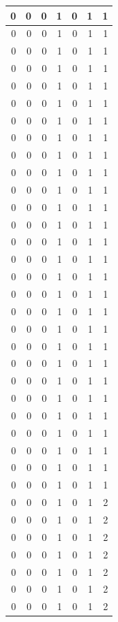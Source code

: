 \documentclass[
  12pt,
]{krantz}
\begin{document}
\begin{tabular}{r|r|r|r|r|r|r}
\hline
0 & 0 & 0 & 1 & 0 & 1 & 1\\
\hline
0 & 0 & 0 & 1 & 0 & 1 & 1\\
\hline
0 & 0 & 0 & 1 & 0 & 1 & 1\\
\hline
0 & 0 & 0 & 1 & 0 & 1 & 1\\
\hline
0 & 0 & 0 & 1 & 0 & 1 & 1\\
\hline
0 & 0 & 0 & 1 & 0 & 1 & 1\\
\hline
0 & 0 & 0 & 1 & 0 & 1 & 1\\
\hline
0 & 0 & 0 & 1 & 0 & 1 & 1\\
\hline
0 & 0 & 0 & 1 & 0 & 1 & 1\\
\hline
0 & 0 & 0 & 1 & 0 & 1 & 1\\
\hline
0 & 0 & 0 & 1 & 0 & 1 & 1\\
\hline
0 & 0 & 0 & 1 & 0 & 1 & 1\\
\hline
0 & 0 & 0 & 1 & 0 & 1 & 1\\
\hline
0 & 0 & 0 & 1 & 0 & 1 & 1\\
\hline
0 & 0 & 0 & 1 & 0 & 1 & 1\\
\hline
0 & 0 & 0 & 1 & 0 & 1 & 1\\
\hline
0 & 0 & 0 & 1 & 0 & 1 & 1\\
\hline
0 & 0 & 0 & 1 & 0 & 1 & 1\\
\hline
0 & 0 & 0 & 1 & 0 & 1 & 1\\
\hline
0 & 0 & 0 & 1 & 0 & 1 & 1\\
\hline
0 & 0 & 0 & 1 & 0 & 1 & 1\\
\hline
0 & 0 & 0 & 1 & 0 & 1 & 1\\
\hline
0 & 0 & 0 & 1 & 0 & 1 & 1\\
\hline
0 & 0 & 0 & 1 & 0 & 1 & 1\\
\hline
0 & 0 & 0 & 1 & 0 & 1 & 1\\
\hline
0 & 0 & 0 & 1 & 0 & 1 & 1\\
\hline
0 & 0 & 0 & 1 & 0 & 1 & 1\\
\hline
0 & 0 & 0 & 1 & 0 & 1 & 1\\
\hline
0 & 0 & 0 & 1 & 0 & 1 & 2\\
\hline
0 & 0 & 0 & 1 & 0 & 1 & 2\\
\hline
0 & 0 & 0 & 1 & 0 & 1 & 2\\
\hline
0 & 0 & 0 & 1 & 0 & 1 & 2\\
\hline
0 & 0 & 0 & 1 & 0 & 1 & 2\\
\hline
0 & 0 & 0 & 1 & 0 & 1 & 2\\
\hline
0 & 0 & 0 & 1 & 0 & 1 & 2\\

\end{tabular}
\end{document}
